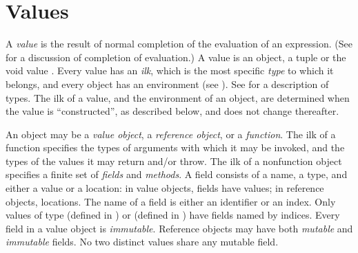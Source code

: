 %
%
%
%

\section{Values}



A \emph{value} is the result of normal completion of the evaluation of an expression.
(See  for a discussion of completion of evaluation.)
A value is an object, a tuple or the void value \EXP{()}.
Every value has an \emph{ilk},
which is the most specific \emph{type} to which it belongs,
and every object has an environment (see ).
See  for a description of types.
The ilk of a value, and the environment of an object, 
are determined when the value is ``constructed'', 
as described below, 
and does not change thereafter.

An object may be a \emph{value object},
a \emph{reference object},
or a \emph{function}.
The ilk of a function specifies the types of arguments with which it may be invoked, 
and the types of the values it may return and/or throw.
The ilk of a nonfunction object 
specifies a finite set of \emph{fields} and \emph{methods}.
A field consists of a name, a type, and either a value or a location:
in value objects, fields have values;
in reference objects, locations.
The name of a field is either an identifier or an index.
Only values of type 
(defined in ) or 
(defined in ) have fields named by indices.
Every field in a value object is \emph{immutable}.
Reference objects may have both \emph{mutable} and \emph{immutable} fields.
No two distinct values share any mutable field.


